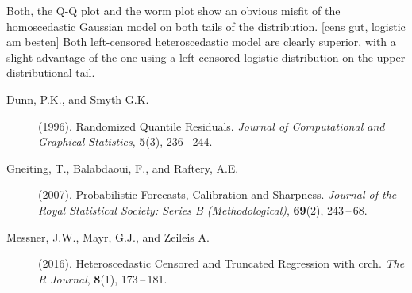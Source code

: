\documentclass[twoside]{report}
\begin{document}
Both, the Q-Q plot and the worm plot show an obvious misfit of the 
homoscedastic Gaussian model on both tails of the distribution.
[cens gut, logistic am besten]
Both left-censored heteroscedastic model are clearly superior, with
a slight advantage of the one using a left-censored logistic distribution
on the upper distributional tail.








\begin{description}
    \item [Dunn, P.K., and Smyth G.K.] (1996).
        Randomized Quantile Residuals.
        {\it Journal of Computational and Graphical Statistics},
        {\bf 5}(3), 236\,--\,244.
\item[Gneiting, T., Balabdaoui, F., and Raftery, A.E.] (2007).
    Probabilistic Forecasts, Calibration and Sharpness.
    {\it Journal of the Royal Statistical Society: Series B (Methodological)},
    {\bf 69}(2), 243\,--\,68.
\item [Messner, J.W., Mayr, G.J., and Zeileis A.] (2016).
    Heteroscedastic Censored and Truncated Regression with crch.
    {\it The R Journal},
    {\bf 8}(1), 173\,--\,181.
\end{description}
\end{document}
